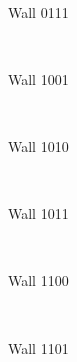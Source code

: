 \documentclass[11pt,a4paper]{report}
\newenvironment{img}{
	\begin{center}
		\begin{figure}[H]
			\begin{center}
			
}{
	\end{center}
		\end{figure}
			\end{center}
}
\begin{document}
				\begin{img}
					\\
					\caption{Wall 0111}
				\end{img}
				\begin{img}
					\\
					\caption{Wall 1001}
				\end{img}
				\begin{img}
					\\
					\caption{Wall 1010}
				\end{img}
				\begin{img}
					\\
					\caption{Wall 1011}
				\end{img}
				\begin{img}
					\\
					\caption{Wall 1100}
				\end{img}
				\begin{img}
					\\
					\caption{Wall 1101}
				\end{img}
\end{document}
